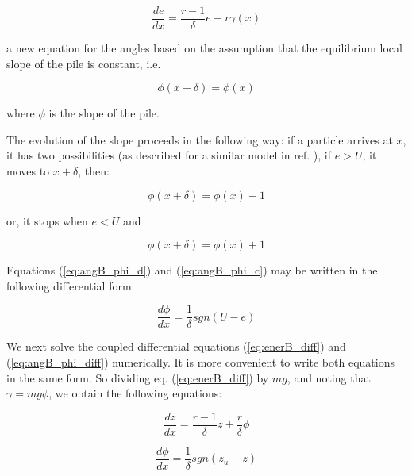 \begin{equation}
\frac{de}{dx}=\frac{r-1}{\delta}e+r\gamma(x)
        \label{eq:enerB_diff}
\end{equation}

\noindent  a new equation for the angles based on the assumption that the 
equilibrium local slope of the pile is constant, i.e. 

\begin{equation}
\phi(x+\delta)=\phi(x)
        \label{eq:angB_phi}
\end{equation}

\noindent where $\phi$ is the slope of the pile.

The evolution of the slope proceeds in the following way: if a
particle arrives at $x$, it has two possibilities (as described for a
similar model in ref. \cite{Alonso_97}), if $e>U$, it moves to $x+\delta$, then:

\begin{equation}
\phi(x+\delta)=\phi(x)-1
        \label{eq:angB_phi_d}
\end{equation}

\noindent or, it stops when $e<U$ and

\begin{equation}
\phi(x+\delta)=\phi(x)+1
        \label{eq:angB_phi_c}
\end{equation}

Equations (\ref{eq:angB_phi_d}) and (\ref{eq:angB_phi_c}) may be written in the following differential form:

\begin{equation}
\frac{d \phi}{dx}=\frac{1}{\delta} sgn(U-e)
        \label{eq:angB_phi_diff}
\end{equation}

We next solve the coupled differential equations 
(\ref{eq:enerB_diff}) and (\ref{eq:angB_phi_diff}) numerically. 
It is more convenient to write both equations in the same 
form. So dividing  eq. (\ref{eq:enerB_diff}) by $mg$, and noting 
that $\gamma= mg \phi$, we obtain the following equations:

\begin{equation}
\frac{dz}{dx}= \frac{r-1}{\delta}z +\frac{r}{\delta} \phi
        \label{eq:enerB_ns}
\end{equation}

\begin{equation}
\frac{d \phi}{dx}=\frac{1}{\delta} sgn(z_u -z)
\label{eq:phiB_ns}
\end{equation}

